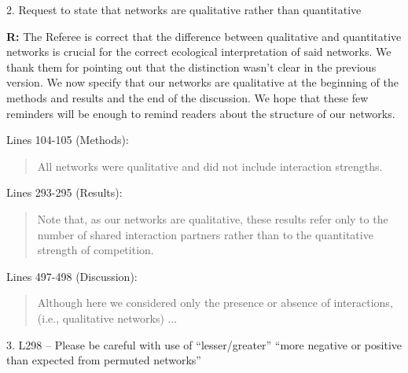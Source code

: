 \documentclass[12pt]{letter}
\begin{document}


	2. Request to state that networks are qualitative rather than quantitative 

		\textbf{R:} The Referee is correct that the difference between qualitative and quantitative networks is crucial for the correct ecological interpretation of said networks. We thank them for pointing out that the distinction wasn't clear in the previous version. We now specify that our networks are qualitative at the beginning of the methods and results and the end of the discussion. We hope that these few reminders will be enough to remind readers about the structure of our networks.

		Lines 104-105 (Methods):

		\begin{quotation}

			All networks were qualitative and did not include interaction strengths.

		\end{quotation}


		Lines 293-295 (Results):
		
		\begin{quotation}

			Note that, as our networks 
		    are qualitative, these results refer only to the number of shared interaction
	    	partners rather than to the quantitative strength of competition.

    	\end{quotation}


    	Lines 497-498 (Discussion):

    	\begin{quotation}

		  Although here we considered only the presence or absence of interactions,
		  (i.e., qualitative networks) ...

    	\end{quotation}


	3. L298 – Please be careful with use of “lesser/greater” “more negative or positive than expected from permuted networks” 
\end{document}
